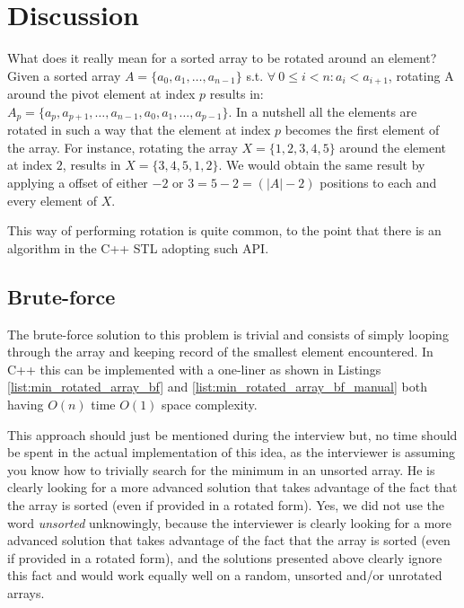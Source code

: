 \section{Discussion}
\label{min_rotated_array:sec:discussion}
What does it really mean for a sorted array to be rotated around an element? Given a sorted array $A=\{a_0, a_1, \ldots,a_{n-1}\}$ s.t. $ \forall \: 0 \leq i < n: a_i < a_{i+1}$, rotating A around the pivot element at index $p$ results in: $A_p=\{a_p, a_{p+1}, \ldots,a_{n-1}, a_0, a_1, \ldots, a_{p-1}\}$. In a nutshell all the elements are rotated in such a way that the element at index $p$ becomes the first element of the array. For instance, rotating the array $X=\{1,2,3,4,5\}$ around the element at index $2$, results in $X=\{3,4,5,1,2\}$. We would obtain the same result by applying a offset of either $-2$ or $3=5-2=(|A|-2)$ positions to each and every element of $X$. 

This way of performing rotation is quite common, to the point that there is an algorithm in the C++ STL\cite{cit::std::rotate} adopting such API.

\subsection{Brute-force}
\label{min_rotated_array:sec:bruteforce}
The brute-force solution to this problem is trivial and consists of simply looping through the array and keeping record of the smallest element encountered.
In C++ this can be implemented with a one-liner as shown in Listings \ref{list:min_rotated_array_bf} and \ref{list:min_rotated_array_bf_manual} both having $O(n)$ time $O(1)$ space complexity.





This approach should just be mentioned during the interview but, no time should be spent in the actual implementation of this idea, as the interviewer is assuming you know how to trivially search for the minimum in an unsorted array. He is clearly looking for a more advanced solution that takes advantage of the fact that the array is sorted (even if provided in a rotated form).
Yes, we did not use the word \textit{unsorted} unknowingly, because the interviewer is clearly looking for a more advanced solution that takes advantage of the fact that the array is sorted (even if provided in a rotated form), and the solutions presented above clearly ignore this fact and would work equally well on a random, unsorted and/or unrotated arrays.


